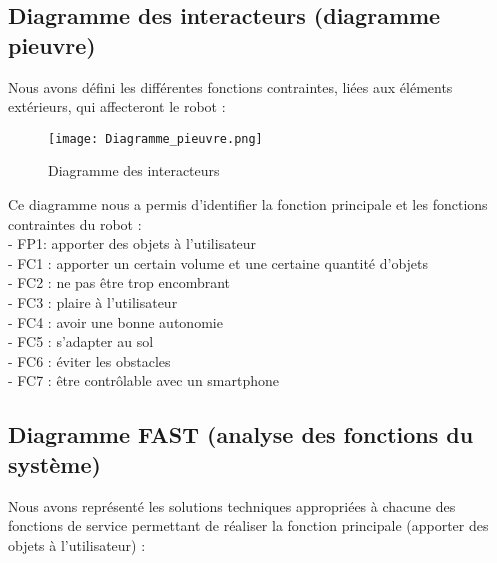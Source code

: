 \documentclass[12pt,a4paper]{article}
\begin{document}
	\subsection{Diagramme des interacteurs (diagramme pieuvre)}

Nous avons défini les différentes fonctions contraintes, liées aux éléments extérieurs, qui affecteront le robot :

	\begin{figure}[ht!]
		\centering
			\texttt{[image: Diagramme\_pieuvre.png]}
			\caption[Diagramme des interacteurs - Illustration réalisée par notre groupe, disponible à l'adresse : \url{https://github.com/thaspdev/PATRICK/illustrations/Diagramme_pieuvre.png}]{Diagramme des interacteurs\label{overflow}}
	\end{figure}

Ce diagramme nous a permis d'identifier la fonction principale et les fonctions contraintes du robot :\\
\indent - FP1: apporter des objets à l'utilisateur\\
\indent - FC1 : apporter un certain volume et une certaine quantité d'objets\\
\indent - FC2 : ne pas être trop encombrant\\
\indent - FC3 : plaire à l'utilisateur\\
\indent - FC4 : avoir une bonne autonomie\\
\indent - FC5 : s'adapter au sol\\
\indent - FC6 : éviter les obstacles\\
\indent - FC7 : être contrôlable avec un smartphone\\


	\subsection{Diagramme FAST (analyse des fonctions du système)}

\indent \indent Nous avons représenté les solutions techniques appropriées à chacune des fonctions de service permettant de réaliser la fonction principale (apporter des objets à l'utilisateur) :
\end{document}
